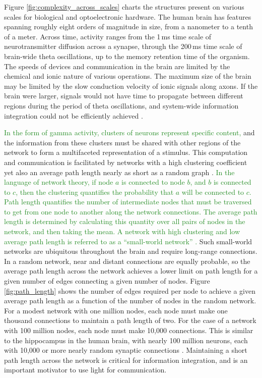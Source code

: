 \documentclass[twocolumn]{article}
\begin{document}
Figure \ref{fig:complexity_across_scales} charts the structures present on various scales for biological and optoelectronic hardware. The human brain has features spanning roughly eight orders of magnitude in size, from a nanometer to a tenth of a meter. Across time, activity ranges from the 1\,ms time scale of neurotransmitter diffusion across a synapse, through the 200\,ms time scale of brain-wide theta oscillations, up to the memory retention time of the organism. The speeds of devices and communication in the brain are limited by the chemical and ionic nature of various operations. The maximum size of the brain may be limited by the slow conduction velocity of ionic signals along axons. If the brain were larger, signals would not have time to propagate between different regions during the period of theta oscillations, and system-wide information integration could not be efficiently achieved \cite{bu2006,sh2019}.

\textcolor{ForestGreen}{In the form of gamma activity, clusters of neurons represent specific content,} and the information from these clusters must be shared with other regions of the network to form a multifaceted representation of a stimulus. This computation and communication is facilitated by networks with a high clustering coefficient yet also an average path length nearly as short as a random graph \cite{eskn2015}. \textcolor{ForestGreen}{In the language of network theory, if node $a$ is connected to node $b$, and $b$ is connected to $c$, then the clustering quantifies the probability that $a$ will be connected to $c$. Path length quantifies the number of intermediate nodes that must be traversed to get from one node to another along the network connections. The average path length is determined by calculating this quantity over all pairs of nodes in the network, and then taking the mean. A network with high clustering and low average path length is referred to as a ``small-world network'' \cite{wast1998}.} Such small-world networks are ubiquitous throughout the brain \cite{sp2010} and require long-range connections. In a random network, near and distant connections are equally probable, so the average path length across the network achieves a lower limit on path length for a given number of edges connecting a given number of nodes. Figure \ref{fig:path_length} shows the number of edges required per node to achieve a given average path length as a function of the number of nodes in the random network. For a modest network with one million nodes, each node must make one thousand connections to maintain a path length of two. For the case of a network with 100 million nodes, each node must make 10,000 connections. This is similar to the hippocampus in the human brain, with nearly 100 million neurons, each with 10,000 or more nearly random synaptic connections \cite{bu2006}. Maintaining a short path length across the network is critical for information integration, and is an important motivator to use light for communication.
\end{document}
